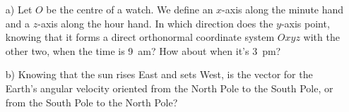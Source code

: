 %
%

\begin{center}
\vspace*{5mm}
\end{center}


\begin{enumerate}
\item[a)] Let $O$ be the centre of a watch. We define an $x$-axis along the minute hand and a $z$-axis along the hour hand. In which direction does the $y$-axis point, knowing that it forms a direct orthonormal coordinate system $Oxyz$ with the other two, when the time is 9~am? How about when it's 3~pm?


\item[b)] Knowing that the sun rises East and sets West, is the vector for the Earth's angular velocity oriented from the North Pole to the South Pole, or from the South Pole to the North Pole?
\end{enumerate}
